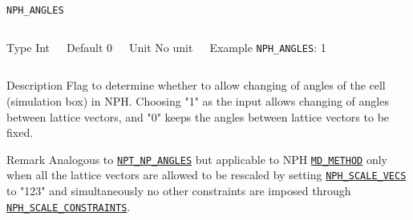 \begin{frame}[allowframebreaks]{\texttt{NPH\_ANGLES}} \label{NPH_ANGLES}
\vspace*{-12pt}
\begin{columns}
\begin{block}{Type}
Int
\end{block}

\begin{block}{Default}
0
\end{block}

\begin{block}{Unit}
No unit
\end{block}

\begin{block}{Example}
\texttt{NPH\_ANGLES}: 1
\end{block}
\end{columns}

\begin{block}{Description}
Flag to determine whether to allow changing of angles of the cell (simulation box) in NPH. Choosing "1" as the input allows changing of angles between lattice vectors, and "0" keeps the angles between lattice vectors to be fixed.
\end{block}

\begin{block}{Remark}
Analogous to \hyperlink{NPT\_NP\_ANGLES}{\texttt{NPT\_NP\_ANGLES}} but applicable to NPH \hyperlink{MD_METHOD}{\texttt{MD\_METHOD}} only when all the lattice vectors are allowed to be rescaled by setting \hyperlink{NPH\_SCALE\_VECS}{\texttt{NPH\_SCALE\_VECS}} to "123" and simultaneously no other constraints are imposed through \hyperlink{NPH\_SCALE\_CONSTRAINTS}{\texttt{NPH\_SCALE\_CONSTRAINTS}}.
\end{block}

\end{frame}



